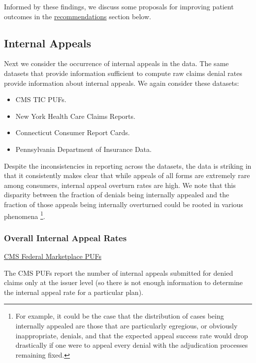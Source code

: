 \documentclass[12pt, a4paper,twoside,parskip=full]{report}
\theoremstyle{plain} %
\theoremstyle{definition} %
\theoremstyle{remark} %
\numberwithin{equation}{chapter}
\begin{document}
		Informed by these findings, we discuss some proposals for improving patient outcomes 
		in the \hyperref[recommendations]{recommendations} section below.
		
		
		
		\subsection{Internal Appeals}\label{publicdata:internalappeals}
		
		Next we consider the occurrence of internal appeals in the data. The same datasets that provide information sufficient to compute raw claims denial rates provide information about internal appeals. We again consider these datasets:
		
		\begin{itemize}
			\item CMS TIC PUFs.
			\item New York Health Care Claims Reports.
			\item Connecticut Consumer Report Cards.
			\item Pennsylvania Department of Insurance Data.
		\end{itemize}
	
		Despite the inconsistencies in reporting across the datasets, the data is striking in that it consistently makes clear that while appeals of all forms are extremely rare among consumers, internal appeal overturn rates are high. We note that this disparity between the fraction of denials being internally appealed and the fraction of those appeals being internally overturned could be rooted in various phenomena \footnote{For example, it could be the case that the distribution of cases being internally appealed are those that are particularly egregious, or obviously inappropriate, denials, and that the expected appeal success rate would drop drastically if one were to appeal every denial with the adjudication processes remaining fixed. }.
		
		
		\subsubsection{Overall Internal Appeal Rates}
		
		\underline{CMS Federal Marketplace PUFs}
		
		The CMS PUFs report the number of internal appeals submitted for denied claims only at the issuer level (so there is not enough information to determine the internal appeal rate for a particular plan).
		
\end{document}
